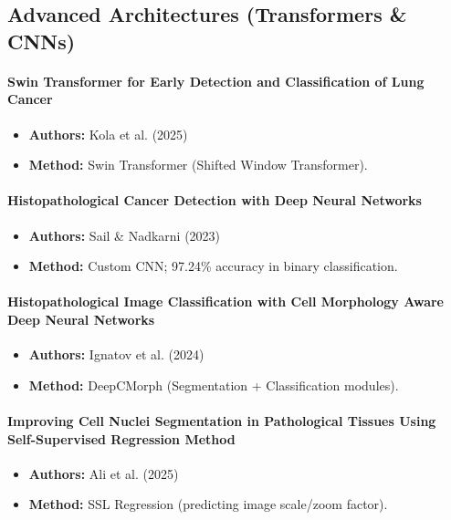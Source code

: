 \documentclass[conference]{IEEEtran}
\begin{document}
\subsection{Advanced Architectures (Transformers \& CNNs)}

\paragraph{Swin Transformer for Early Detection and Classification of Lung Cancer}
\begin{itemize}
\item \textbf{Authors:} Kola et al. (2025) \cite{kola2025}
\item \textbf{Method:} Swin Transformer (Shifted Window Transformer).
\end{itemize}

\paragraph{Histopathological Cancer Detection with Deep Neural Networks}
\begin{itemize}
\item \textbf{Authors:} Sail \& Nadkarni (2023) \cite{sail2023}
\item \textbf{Method:} Custom CNN; 97.24\% accuracy in binary classification.
\end{itemize}

\paragraph{Histopathological Image Classification with Cell Morphology Aware Deep Neural Networks}
\begin{itemize}
\item \textbf{Authors:} Ignatov et al. (2024) \cite{ignatov2024}
\item \textbf{Method:} DeepCMorph (Segmentation + Classification modules).
\end{itemize}

\paragraph{Improving Cell Nuclei Segmentation in Pathological Tissues Using Self-Supervised Regression Method}
\begin{itemize}
\item \textbf{Authors:} Ali et al. (2025) \cite{ali2025}
\item \textbf{Method:} SSL Regression (predicting image scale/zoom factor).
\end{itemize}
\end{document}
